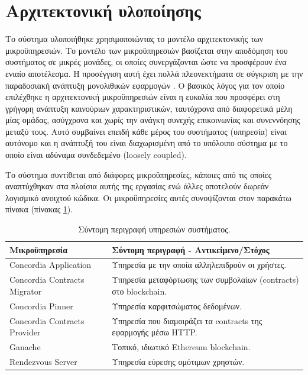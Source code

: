 \section{Αρχιτεκτονική υλοποίησης} \label{section:4-4-implementation-architecture}

Το σύστημα υλοποιήθηκε χρησιμοποιώντας το μοντέλο αρχιτεκτονικής των μικροϋπηρεσιών. Το μοντέλο των μικροϋπηρεσιών βασίζεται στην αποδόμηση του συστήματος σε μικρές μονάδες, οι οποίες συνεργάζονται ώστε να προσφέρουν ένα ενιαίο αποτέλεσμα. Η προσέγγιση αυτή έχει πολλά πλεονεκτήματα σε σύγκριση με την παραδοσιακή ανάπτυξη μονολιθικών εφαρμογών %
. Ο βασικός λόγος για τον οποίο επιλέχθηκε η αρχιτεκτονική μικροϋπηρεσιών είναι η ευκολία που προσφέρει στη γρήγορη ανάπτυξη καινούριων χαρακτηριστικών, ταυτόχρονα από διαφορετικά μέλη μίας ομάδας, ασύγχρονα και χωρίς την ανάγκη συνεχής επικοινωνίας και συνεννόησης μεταξύ τους. Αυτό συμβαίνει επειδή κάθε μέρος του συστήματος (υπηρεσία) είναι αυτόνομο και η ανάπτυξή του είναι διαχωρισμένη από το υπόλοιπο σύστημα με το οποίο είναι αδύναμα συνδεδεμένο (loosely coupled).

Το σύστημα συντίθεται από διάφορες μικροϋπηρεσίες, κάποιες από τις οποίες αναπτύχθηκαν στα πλαίσια αυτής της εργασίας ενώ άλλες αποτελούν δωρεάν λογισμικό ανοιχτού κώδικα. Οι μικροϋπηρεσίες αυτές συνοψίζονται στον παρακάτω πίνακα (πίνακας \ref{table:4-4-microservice-summary}).

\begin{table}[H]
\begin{center}
\begin{tabular}{|l l|}
 \hline
 \textbf{Μικροϋπηρεσία} & \textbf{Σύντομη περιγραφή - Αντικείμενο/Στόχος} \\
 \hline\hline
 Concordia Application & Υπηρεσία με την οποία αλληλεπιδρούν οι χρήστες. \\ [0.5ex]
 \hline
 Concordia Contracts Migrator & Υπηρεσία μεταφόρτωσης των συμβολαίων (contracts) στο blockchain. \\ [0.5ex]
 \hline
 Concordia Pinner & Υπηρεσία καρφιτσώματος δεδομένων. \\ [0.5ex]
 \hline
 Concordia Contracts Provider & Υπηρεσία που διαμοιράζει τα contracts της εφαρμογής μέσω HTTP. \\ [0.5ex]
 \hline
 Ganache & Τοπικό, ιδιωτικό Ethereum blockchain. \\ [0.5ex]
 \hline
 Rendezvous Server & Υπηρεσία εύρεσης ομότιμων χρηστών. \\ [0.5ex]
 \hline
\end{tabular}
\end{center}
\caption{Σύντομη περιγραφή υπηρεσιών συστήματος.}
\label{table:4-4-microservice-summary}
\end{table}

